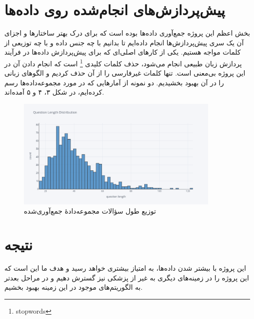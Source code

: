 \documentclass{CCI2020}
\begin{document}
\section{پیش‌پردازش‌های انجام‌شده روی داده‌ها}
بخش اعظم این پروژه جمع‌آوری داده‌ها بوده است که برای درک بهتر ساختارها و اجزای آن یک سری پیش‌پردازش‌ها انجام داده‌ایم تا بدانیم با چه جنس داده و با چه توزیعی از کلمات مواجه هستیم. یکی از کارهای اصلی‌ای که برای پیش‌پردازش داده‌ها در فرآیند پردازش زبان طبیعی انجام می‌شود، حذف کلمات کلیدی \footnote{stopwords} است که انجام دادن آن در این پروژه بی‌معنی است. تنها کلمات غیرفارسی را از آن حذف کردیم و الگوهای زبانی را در آن بهبود بخشیدیم. دو نمونه از آمارهایی که در مورد مجموعه‌داده‌ها رسم کرده‌ایم، در شکل ۳، ۴ و ۵ آمده‌اند.
\begin{figure}[htp]
    \centering
    \includegraphics[width=10cm]{images/newplot (1).png}
    \caption{توزیع طول سؤالات مجموعه‌دادهٔ جمع‌آوری‌شده}
    \label{fig:galaxy}
\end{figure}



\section{نتیجه}
این پروژه با بیشتر شدن داده‌ها، به امتیاز بیشتری خواهد رسید و هدف ما این است که این پروژه را در زمینه‌های دیگری به غیر از پزشکی نیز گسترش دهیم و در مراحل بعدتر به الگوریتم‌های موجود در این زمینه بهبود بخشیم.

%


\end{document}
